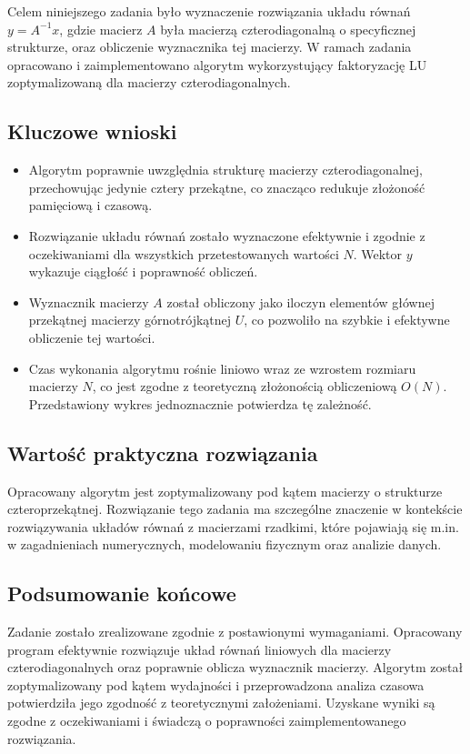 \documentclass[a4paper,12pt]{article}
\begin{document}
Celem niniejszego zadania było wyznaczenie rozwiązania układu równań $y = A^{-1}x$, gdzie macierz $A$ była macierzą czterodiagonalną o specyficznej strukturze, oraz obliczenie wyznacznika tej macierzy. W ramach zadania opracowano i zaimplementowano algorytm wykorzystujący faktoryzację LU zoptymalizowaną dla macierzy czterodiagonalnych.

\subsection{Kluczowe wnioski}

\begin{itemize}
    \item Algorytm poprawnie uwzględnia strukturę macierzy czterodiagonalnej, przechowując jedynie cztery przekątne, co znacząco redukuje złożoność pamięciową i czasową.
    \item Rozwiązanie układu równań zostało wyznaczone efektywnie i zgodnie z oczekiwaniami dla wszystkich przetestowanych wartości $N$. Wektor $y$ wykazuje ciągłość i poprawność obliczeń.
    \item Wyznacznik macierzy $A$ został obliczony jako iloczyn elementów głównej przekątnej macierzy górnotrójkątnej $U$, co pozwoliło na szybkie i efektywne obliczenie tej wartości.
    \item Czas wykonania algorytmu rośnie liniowo wraz ze wzrostem rozmiaru macierzy $N$, co jest zgodne z teoretyczną złożonością obliczeniową $O(N)$. Przedstawiony wykres jednoznacznie potwierdza tę zależność.
\end{itemize}

\subsection{Wartość praktyczna rozwiązania}

Opracowany algorytm jest zoptymalizowany pod kątem macierzy o strukturze czteroprzekątnej. Rozwiązanie tego zadania ma szczególne znaczenie w kontekście rozwiązywania układów równań z macierzami rzadkimi, które pojawiają się m.in. w zagadnieniach numerycznych, modelowaniu fizycznym oraz analizie danych.

\subsection{Podsumowanie końcowe}

Zadanie zostało zrealizowane zgodnie z postawionymi wymaganiami. Opracowany program efektywnie rozwiązuje układ równań liniowych dla macierzy czterodiagonalnych oraz poprawnie oblicza wyznacznik macierzy. Algorytm został zoptymalizowany pod kątem wydajności i przeprowadzona analiza czasowa potwierdziła jego zgodność z teoretycznymi założeniami. Uzyskane wyniki są zgodne z oczekiwaniami i świadczą o poprawności zaimplementowanego rozwiązania.
\end{document}
